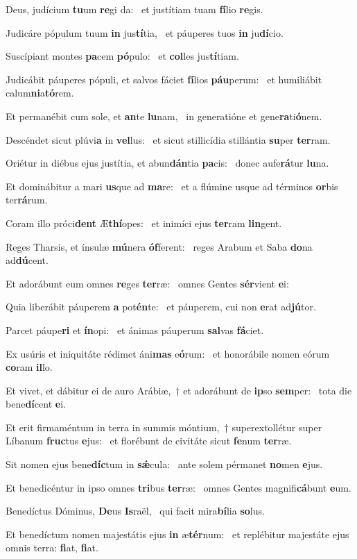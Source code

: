 \item Deus, judícium \textbf{tu}um \textbf{re}gi da:~\psstar{} et justítiam tuam \textbf{fí}lio \textbf{re}gis.
\item Judicáre pópulum tuum \textbf{in} jus\textbf{tí}tia,~\psstar{} et páuperes tuos \textbf{in} ju\textbf{dí}cio.
\item Suscípiant montes \textbf{pa}cem \textbf{pó}pulo:~\psstar{} et \textbf{col}les jus\textbf{tí}tiam.
\item Judicábit páuperes pópuli, et salvos fáciet \textbf{fí}lios \textbf{páu}perum:~\psstar{} et humiliábit calum\textbf{ni}a\textbf{tó}rem.
\item Et permanébit cum sole, et \textbf{an}te \textbf{lu}nam,~\psstar{} in generatióne et gene\textbf{ra}ti\textbf{ó}nem.
\item Descéndet sicut plúvi\textbf{a} in \textbf{vel}lus:~\psstar{} et sicut stillicídia stillántia \textbf{su}per \textbf{ter}ram.
\item Oriétur in diébus ejus justítia, et abun\textbf{dán}tia \textbf{pa}cis:~\psstar{} donec aufe\textbf{rá}tur \textbf{lu}na.
\item Et dominábitur a mari \textbf{us}que ad \textbf{ma}re:~\psstar{} et a flúmine usque ad términos \textbf{or}bis ter\textbf{rá}rum.
\item Coram illo próci\textbf{dent} Æ\textbf{thí}opes:~\psstar{} et inimíci ejus \textbf{ter}ram \textbf{lin}gent.
\item Reges Tharsis, et ínsulæ \textbf{mú}nera \textbf{óf}ferent:~\psstar{} reges Arabum et Saba \textbf{do}na ad\textbf{dú}cent.
\item Et adorábunt eum omnes \textbf{re}ges \textbf{ter}ræ:~\psstar{} omnes Gentes \textbf{sér}vient \textbf{e}i:
\item Quia liberábit páuperem \textbf{a} pot\textbf{én}te:~\psstar{} et páuperem, cui non \textbf{e}rat ad\textbf{jú}tor.
\item Parcet páupe\textbf{ri} et \textbf{ín}opi:~\psstar{} et ánimas páuperum \textbf{sal}vas \textbf{fá}ciet.
\item Ex usúris et iniquitáte rédimet áni\textbf{mas} e\textbf{ó}rum:~\psstar{} et honorábile nomen eórum \textbf{co}ram \textbf{il}lo.
\item Et vivet, et dábitur ei de auro Arábiæ,~† et adorábunt de \textbf{ip}so \textbf{sem}per:~\psstar{} tota die bene\textbf{dí}cent \textbf{e}i.
\item Et erit firmaméntum in terra in summis móntium,~† superextollétur super Líbanum \textbf{fruc}tus \textbf{e}jus:~\psstar{} et florébunt de civitáte sicut \textbf{fe}num \textbf{ter}ræ.
\item Sit nomen ejus bene\textbf{díc}tum in \textbf{sǽ}cula:~\psstar{} ante solem pérmanet \textbf{no}men \textbf{e}jus.
\item Et benedicéntur in ipso omnes \textbf{tri}bus \textbf{ter}ræ:~\psstar{} omnes Gentes magnifi\textbf{cá}bunt \textbf{e}um.
\item Benedíctus Dóminus, \textbf{De}us \textbf{Is}raël,~\psstar{} qui facit mira\textbf{bí}lia \textbf{so}lus.
\item Et benedíctum nomen majestátis ejus \textbf{in} æ\textbf{tér}num:~\psstar{} et replébitur majestáte ejus omnis terra: \textbf{fi}at, \textbf{fi}at.
